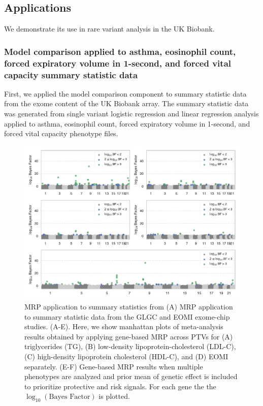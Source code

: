 \documentclass{nature}
\begin{document}
  
\subsection{Applications}
We demonstrate its use in rare variant analysis in the UK Biobank.

\subsubsection{Model comparison applied to asthma, eosinophil count, forced expiratory volume in 1-second, and forced vital capacity summary statistic data}
 First, we applied the model comparison component to summary statistic data from the exome content of the UK Biobank array. The summary statistic data was generated from single variant logistic regression and linear regression analysis applied to asthma, eosinophil count, forced expiratory volume in 1-second, and forced vital capacity phenotype files.

\begin{figure}
\centering
\includegraphics[width=\textwidth]{../figures/manhattan.pdf}
  \caption{MRP application to summary statistics from (A) 
  MRP application to summary statistic data from the GLGC and EOMI exome-chip studies. (A-E). Here, we show manhattan plots of meta-analysis results obtained by applying gene-based MRP across PTVs for (A) triglycerides (TG), (B) low-density lipoprotein-cholesterol (LDL-C), (C) high-density lipoprotein cholesterol (HDL-C), and (D) EOMI separately. (E-F) Gene-based MRP results when multiple phenotypes are analyzed and prior mean of genetic effect is included to prioritize protective and risk signals. For each gene the the $\log_{10}\left(\textrm{Bayes Factor}\right)$ is plotted.}
  \label{Fig3}
\end{figure}
\end{document}
